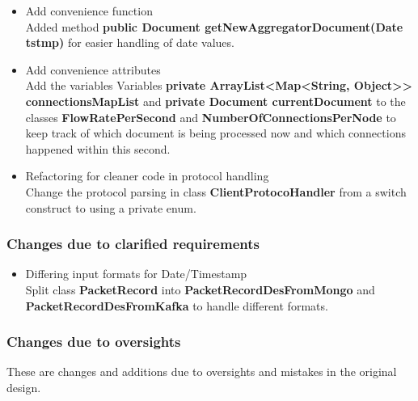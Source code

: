 \documentclass[oneside, english, final]{design}
\begin{document}
\begin{itemize}
  \item{Add convenience function}
    \\
    Added method \textsf{\textbf{public Document getNewAggregatorDocument(Date tstmp)}} for easier handling of date values.

    
  \item{Add convenience attributes}
    \\
    Add the variables Variables
    \textsf{\textbf{private ArrayList<Map<String, Object>> connectionsMapList}} and
    \textsf{\textbf{private Document currentDocument}} to the classes \textsf{\textbf{FlowRatePerSecond}} and \textsf{\textbf{NumberOfConnectionsPerNode}} to
    keep track of which document is being processed now and which connections happened within this second.


\item{Refactoring for cleaner code in protocol handling}
  \\
  Change the protocol parsing in class \textsf{\textbf{ClientProtocoHandler}} from a switch construct to using a private enum.

\end{itemize}

\subsubsection{Changes due to clarified requirements}
\begin{itemize}
\item{Differing input formats for Date/Timestamp}
  \\
  Split class \textsf{\textbf{PacketRecord}} into \textsf{\textbf{PacketRecordDesFromMongo}} and \textsf{\textbf{PacketRecordDesFromKafka}} to handle different formats.

\end{itemize}


\subsubsection{Changes due to oversights}

These are changes and additions due to oversights and mistakes in the original design.
\end{document}
